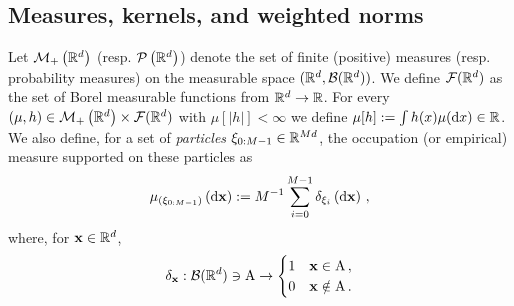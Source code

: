\documentclass[11pt]{article}
\theoremstyle{plain}
\theoremstyle{definition}
\theoremstyle{remark}
\begin{document}
\subsection{Measures, kernels, and weighted norms}

Let $\mathcal{M}_{+}\left(\mathbb{R}^d\right)$ (resp. $\mathcal{P} \left(\mathbb{R}^d\right)$) denote the set of finite (positive) measures (resp. probability measures) on the measurable space $(\mathbb{R}^{d}, \mathcal{B}(\mathbb{R}^d))$.
We define $\mathcal{F}(\mathbb{R}^d)$ as the set of Borel measurable functions from $\mathbb{R}^d \rightarrow \mathbb{R}$.
For every $(\mu, h) \in \mathcal{M}_{+}\left(\mathbb{R}^d\right)\times \mathcal{F}(\mathbb{R}^d)$ with $\mu [|h|] < \infty$ we define $\mu [h] := \int h(x) \mu(\mathrm{d} x) \in \mathbb{R}$. We also define, for a set of \emph{particles} $\xi_{0:M-1} \in \mathbb{R}^{Md}$, the occupation (or empirical) measure supported on these particles as
\begin{align*}
    \empmeas{\chunk{\particle}{0}{\npart-1}}[\rmd \x] \eqdef \npart^{-1}\sum_{i=0}^{\npart-1}\dirac{\particle_i}[\rmd \x]\eqsp, 
\end{align*} 
where, for $\mathbf{x}\in \mathbb{R}^d$,
$$
    \dirac{\x}: \borelians{\rset^\xdim} \ni \set{A} \rightarrow
    \begin{cases}
        1 & \x \in \set{A} \eqsp, \\
        0 & \x \notin \set{A}\eqsp.
    \end{cases}
$$
\end{document}
